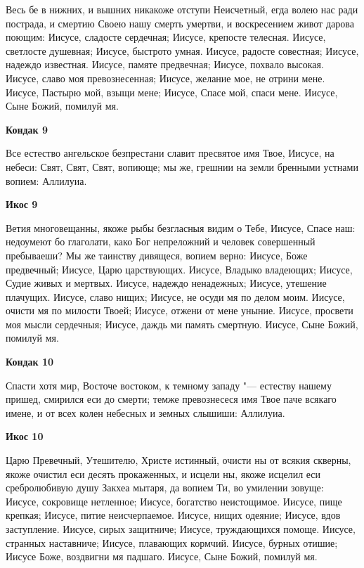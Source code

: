 Весь
бе в нижних, и вышних никакоже отступи Неисчетный, егда волею нас ради пострада, и смертию Своею нашу смерть умертви, и воскресением живот дарова поющим: Иисусе, сладосте сердечная; Иисусе, крепосте телесная. Иисусе, светлосте душевная; Иисусе, быстрото умная. Иисусе, радосте совестная; Иисусе, надеждо известная. Иисусе, памяте предвечная; Иисусе, похвало высокая. Иисусе, славо моя превознесенная; Иисусе, желание мое, не отрини мене. Иисусе, Пастырю мой, взыщи мене; Иисусе, Спасе мой, спаси мене. Иисусе, Сыне Божий, помилуй мя. 


\medskip
\bfseries Кондак 9\normalfont{}


Все
естество ангельское безпрестани славит пресвятое имя Твое, Иисусе, на небеси: Свят, Свят, Свят, вопиюще; мы же, грешнии на земли бренными устнами вопием: Аллилуиа. 


\medskip
\bfseries Икос 9\normalfont{}


Ветия
многовещанны, якоже рыбы безгласныя видим о Тебе, Иисусе, Спасе наш: недоумеют бо глаголати, како Бог непреложний и человек совершенный пребываеши? Мы же таинству дивящеся, вопием верно: Иисусе, Боже предвечный; Иисусе, Царю царствующих. Иисусе, Владыко владеющих; Иисусе, Судие живых и мертвых. Иисусе, надеждо ненадежных; Иисусе, утешение плачущих. Иисусе, славо нищих; Иисусе, не осуди мя по делом моим. Иисусе, очисти мя по милости Твоей; Иисусе, отжени от мене уныние. Иисусе, просвети моя мысли сердечныя; Иисусе, даждь ми память смертную. Иисусе, Сыне Божий, помилуй мя.


\medskip
\bfseries Кондак 10\normalfont{}


Спасти
хотя мир, Восточе востоком, к темному западу "--- естеству нашему пришед, смирился еси до смерти; темже превознесеся имя Твое паче всякаго имене, и от всех колен небесных и земных слышиши: Аллилуиа.


\medskip
\bfseries Икос 10\normalfont{}


Царю
Превечный, Утешителю, Христе истинный, очисти ны от всякия скверны, якоже очистил еси десять прокаженных, и исцели ны, якоже исцелил еси сребролюбивую душу Закхеа мытаря, да вопием Ти, во умилении зовуще: Иисусе, сокровище нетленное; Иисусе, богатство неистощимое. Иисусе, пище крепкая; Иисусе, питие неисчерпаемое. Иисусе, нищих одеяние; Иисусе, вдов заступление. Иисусе, сирых защитниче; Иисусе, труждающихся помоще. Иисусе, странных наставниче; Иисусе, плавающих кормчий. Иисусе, бурных отишие; Иисусе Боже, воздвигни мя падшаго. Иисусе, Сыне Божий, помилуй мя.


